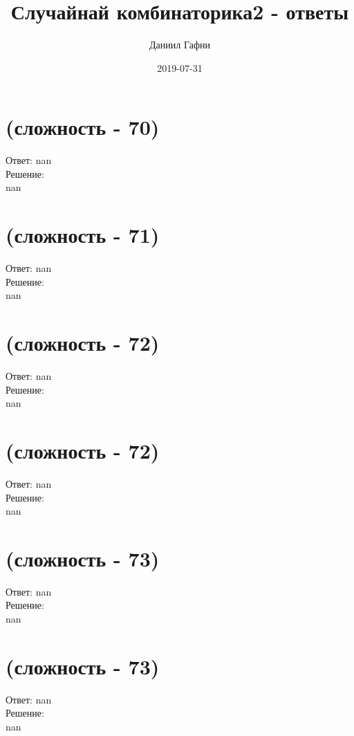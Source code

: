 \documentclass[a4paper,11pt]{article}%
\title{Случайнай комбинаторика2 {-} ответы}%
\author{Даниил Гафни}%
\date{2019{-}07{-}31}%
\begin{document}
%
\normalsize%
\maketitle%
\section{(сложность {-} 70)}%
\label{sec:( {-} 70)}%
\hspace{3ex} Ответ: nan \\%
%
\hspace*{3ex} Решение: \\%
nan

%
\section{(сложность {-} 71)}%
\label{sec:( {-} 71)}%
\hspace{3ex} Ответ: nan \\%
%
\hspace*{3ex} Решение: \\%
nan

%
\section{(сложность {-} 72)}%
\label{sec:( {-} 72)}%
\hspace{3ex} Ответ: nan \\%
%
\hspace*{3ex} Решение: \\%
nan

%
\section{(сложность {-} 72)}%
\label{sec:( {-} 72)}%
\hspace{3ex} Ответ: nan \\%
%
\hspace*{3ex} Решение: \\%
nan

%
\section{(сложность {-} 73)}%
\label{sec:( {-} 73)}%
\hspace{3ex} Ответ: nan \\%
%
\hspace*{3ex} Решение: \\%
nan

%
\section{(сложность {-} 73)}%
\label{sec:( {-} 73)}%
\hspace{3ex} Ответ: nan \\%
%
\hspace*{3ex} Решение: \\%
nan
\end{document}
